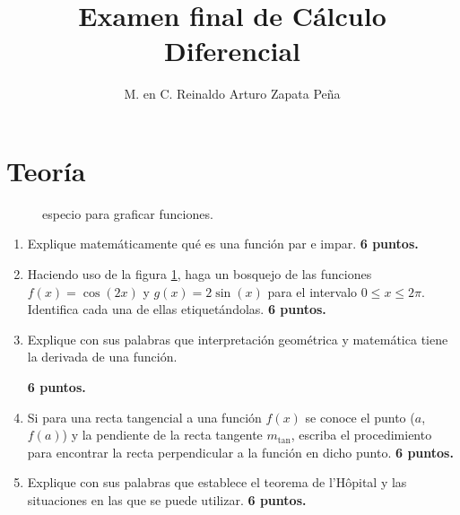 \documentclass{article}
\title{Examen final de Cálculo Diferencial}
\author{M. en C. Reinaldo Arturo Zapata Peña}
\begin{document}


\section{Teoría} %
\label{sec:teoria}


\begin{figure}[b]
    \centering
    \caption{especio  para graficar funciones.}
    \label{fig:graficar}
\end{figure}
\begin{enumerate}
\item Explique matemáticamente qué es una función par e impar.
\hfill \textbf{6 puntos.}


\item Haciendo uso de la figura \ref{fig:graficar}, haga un bosquejo de las
funciones $f(x)=\cos(2x)$ y $g(x)=2\sin(x)$ para el intervalo $0 \leq x \leq
2\pi$. Identifica cada una de ellas etiquet\'andolas.
\hfill \textbf{6 puntos.}


\item Explique con sus palabras que interpretación geométrica y matemática tiene
la derivada de una función.

\hfill \textbf{6 puntos.}


\item Si para una recta tangencial a una función $f(x)$ se conoce el punto
($a$,$f(a)$) y la pendiente de la recta tangente $m_{\text{tan}}$, escriba el
procedimiento para encontrar la recta perpendicular a la función en dicho punto.
\hfill \textbf{6 puntos.}


\item Explique con sus palabras que establece el teorema de l'H\^opital y las
situaciones en las que se puede utilizar.
\hfill \textbf{6 puntos.}


\end{enumerate}
\end{document}
